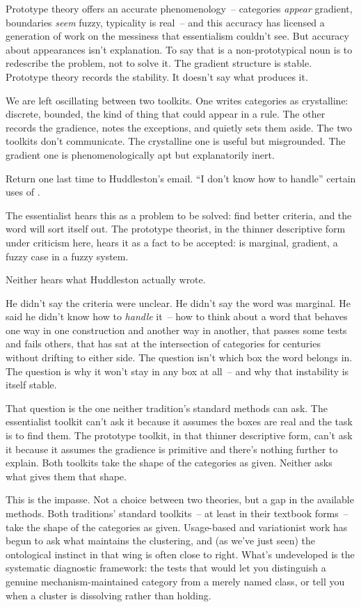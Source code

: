 Prototype theory offers an accurate phenomenology~-- categories \emph{appear} gradient, boundaries \emph{seem} fuzzy, typicality is real~-- and this accuracy has licensed a generation of work on the messiness that essentialism couldn't see. But accuracy about appearances isn't explanation. To say that  is a non-prototypical noun is to redescribe the problem, not to solve it. The gradient structure is stable. Prototype theory records the stability. It doesn't say what produces it.

We are left oscillating between two toolkits. One writes categories as crystalline: discrete, bounded, the kind of thing that could appear in a rule. The other records the gradience, notes the exceptions, and quietly sets them aside. The two toolkits don't communicate. The crystalline one is useful but misgrounded. The gradient one is phenomenologically apt but explanatorily inert.

Return one last time to Huddleston's email. \enquote{I don't know how to handle} certain uses of .

The essentialist hears this as a problem to be solved: find better criteria, and the word will sort itself out. The prototype theorist, in the thinner descriptive form under criticism here, hears it as a fact to be accepted:  is marginal, gradient, a fuzzy case in a fuzzy system.

Neither hears what Huddleston actually wrote.

He didn't say the criteria were unclear. He didn't say the word was marginal. He said he didn't know how to \emph{handle} it~-- how to think about a word that behaves one way in one construction and another way in another, that passes some tests and fails others, that has sat at the intersection of categories for centuries without drifting to either side. The question isn't which box the word belongs in. The question is why it won't stay in any box at all~-- and why that instability is itself stable.

That question is the one neither tradition's standard methods can ask. The essentialist toolkit can't ask it because it assumes the boxes are real and the task is to find them. The prototype toolkit, in that thinner descriptive form, can't ask it because it assumes the gradience is primitive and there's nothing further to explain. Both toolkits take the shape of the categories as given. Neither asks what gives them that shape.

This is the impasse. Not a choice between two theories, but a gap in the available methods. Both traditions' standard toolkits~-- at least in their textbook forms~-- take the shape of the categories as given. Usage-based and variationist work has begun to ask what maintains the clustering, and (as we've just seen) the ontological instinct in that wing is often close to right. What's undeveloped is the systematic diagnostic framework: the tests that would let you distinguish a genuine mechanism-maintained category from a merely named class, or tell you when a cluster is dissolving rather than holding.

